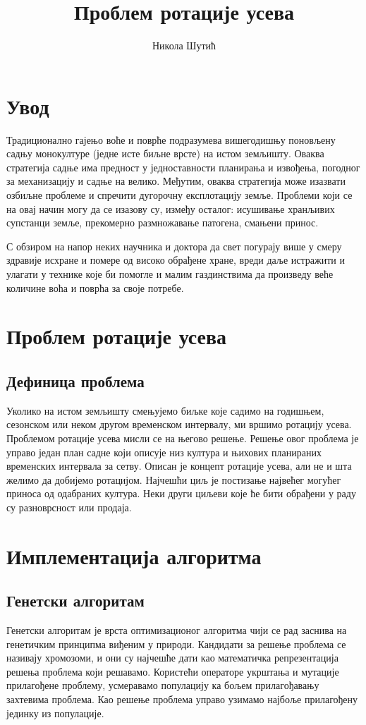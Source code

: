 \documentclass[12pt,fleqn]{article}
\title{Проблем ротације усева}
\author{Никола Шутић}
\affil{Математички факултет, Универзитет у Београду}
\begin{document}
\maketitle
\newpage

\tableofcontents
\newpage

\section{Увод}
Традиционално гајењо воће и поврће подразумева вишегодишњу поновљену садњу монокултуре (једне исте биљне врсте) на истом земљишту. Оваква стратегија садње има предност у једноставности планирања и извођења, погодног за механизацију и садње на велико. Међутим, оваква стратегија може изазвати озбиљне проблеме и спречити дугорочну експлотацију земље. Проблеми који се на овај начин могу да се изазову су, између осталог: исушивање хранљивих супстанци земље, прекомерно размножавање патогена, смањени принос.

С обзиром на напор неких научника и доктора да свет погурају више у смеру здравије исхране и помере од високо обрађене хране, вреди даље истражити и улагати у технике које би помогле и малим газдинствима да произведу веће количине воћа и поврћа за своје потребе.

\section{Проблем ротације усева}
\subsection{Дефиница проблема}
Уколико на истом земљишту смењујемо биљке које садимо на годишњем, сезонском или неком другом временском интервалу, ми вршимо ротацију усева. Проблемом ротације усева мисли се на његово решење. Решење овог проблема је управо један план садне који описује низ култура и њихових планираних временских интервала за сетву. Описан је концепт ротације усева, али не и шта желимо да добијемо ротацијом. Најчешћи циљ је постизање највећег могућег приноса од одабраних култура. Неки други циљеви које ће бити обрађени у раду су разноврсност или продаја.

\section{Имплементација алгоритма}
\subsection{Генетски алгоритам}
Генетски алгоритам је врста оптимизационог алгоритма чији се рад заснива на генетичким принципма виђеним у природи. Кандидати за решење проблема се називају хромозоми, и они су најчешће дати као математичка репрезентација решења проблема који решавамо. Користећи операторе укрштања и мутације прилагођене проблему, усмеравамо популацију ка бољем прилагођавању захтевима проблема. Као решење проблема управо узимамо најбоље прилагођену јединку из популације.
\end{document}
